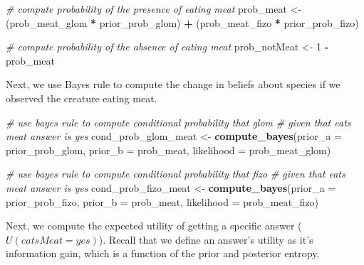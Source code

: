 \documentclass[english,floatsintext,man]{apa6}
\newenvironment{Shaded}{\begin{snugshade}}{\end{snugshade}}
\newcommand{\KeywordTok}[1]{\textcolor[rgb]{0.13,0.29,0.53}{\textbf{#1}}}
\newcommand{\DataTypeTok}[1]{\textcolor[rgb]{0.13,0.29,0.53}{#1}}
\newcommand{\DecValTok}[1]{\textcolor[rgb]{0.00,0.00,0.81}{#1}}
\newcommand{\StringTok}[1]{\textcolor[rgb]{0.31,0.60,0.02}{#1}}
\newcommand{\CommentTok}[1]{\textcolor[rgb]{0.56,0.35,0.01}{\textit{#1}}}
\newcommand{\OperatorTok}[1]{\textcolor[rgb]{0.81,0.36,0.00}{\textbf{#1}}}
\newcommand{\NormalTok}[1]{#1}
\theoremstyle{definition}
\theoremstyle{definition}
\theoremstyle{definition}
\theoremstyle{remark}
\begin{document}
\begin{Shaded}
\begin{Highlighting}[]
\CommentTok{# compute probability of the presence of eating meat}
\NormalTok{prob_meat <-}\StringTok{ }\NormalTok{(prob_meat_glom }\OperatorTok{*}\StringTok{ }\NormalTok{prior_prob_glom) }\OperatorTok{+}\StringTok{ }
\StringTok{  }\NormalTok{(prob_meat_fizo }\OperatorTok{*}\StringTok{ }\NormalTok{prior_prob_fizo)}

\CommentTok{# compute probability of the absence of eating meat}
\NormalTok{prob_notMeat <-}\StringTok{ }\DecValTok{1} \OperatorTok{-}\StringTok{ }\NormalTok{prob_meat}
\end{Highlighting}
\end{Shaded}

\noindent
Next, we use Bayes rule to compute the change in beliefs about species
if we observed the creature eating meat.

\begin{Shaded}
\begin{Highlighting}[]
\CommentTok{# use bayes rule to compute conditional probability that glom }
\CommentTok{# given that eats meat answer is yes}
\NormalTok{cond_prob_glom_meat <-}\StringTok{ }\KeywordTok{compute_bayes}\NormalTok{(}\DataTypeTok{prior_a =}\NormalTok{ prior_prob_glom, }
                                     \DataTypeTok{prior_b =}\NormalTok{ prob_meat, }
                                     \DataTypeTok{likelihood =}\NormalTok{ prob_meat_glom)}

\CommentTok{# use bayes rule to compute conditional probability that fizo }
\CommentTok{# given that eats meat answer is yes}
\NormalTok{cond_prob_fizo_meat <-}\StringTok{ }\KeywordTok{compute_bayes}\NormalTok{(}\DataTypeTok{prior_a =}\NormalTok{ prior_prob_fizo, }
                                     \DataTypeTok{prior_b =}\NormalTok{ prob_meat, }
                                     \DataTypeTok{likelihood =}\NormalTok{ prob_meat_fizo)}
\end{Highlighting}
\end{Shaded}

\noindent
Next, we compute the expected utility of getting a specific answer
(\(U(eatsMeat = yes)\)). Recall that we define an answer's utility as
it's information gain, which is a function of the prior and posterior
entropy.
\end{document}
